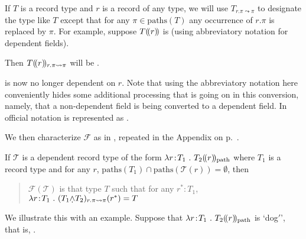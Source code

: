 \begin{shaded}
If $T$ is a
record type and $r$ is a record of any type, we will use
$T_{r.\pi\leadsto\pi}$ to designate the type like $T$ except that
for any $\pi\in\mathrm{paths}(T)$ any occurrence of $r.\pi$ is
replaced by $\pi$.  For example, suppose $T(\!(r)\!)$ is \nexteg{} (using
abbreviatory notation for dependent fields).
\begin{ex} 
\end{ex}
Then $T(\!(r)\!)_{r.\pi\leadsto\pi}$ will be \nexteg{}. 
\begin{ex} 
\end{ex} 
\preveg{} is now no longer dependent on $r$.  Note that using the abbreviatory notation here conveniently hides some
additional processing that is going on in this conversion, namely,
that a non-dependent field is being converted to a dependent field. In
official notation \preveg{} is represented as \nexteg{}. 
  \begin{ex} 
\end{ex} 
We then characterize $\mathcal{F}$ as in \nexteg{}, repeated in the
Appendix on p.~\pageref{pg:fixedpointtype}.
\begin{ex} 
If $\mathcal{T}$ is a dependent record type of the form $\lambda
r\!:\!T_1\ .\ T_2(\!(r)\!)_{\text{path}}$ where $T_1$ is a record type and for any
$r$,
$\mathrm{paths}(T_1)\cap\mathrm{paths}(\mathcal{T}(r))=\emptyset$,
then
\begin{quote}
  $\mathcal{F}(\mathcal{T})$ is that type $T$ such that for any
  $r^*:T_1$, $\lambda r\!:\!T_1\ .\
  (T_1\text{\d{$\wedge$}}T_2)_{r.\pi\leadsto\pi}(r^*)=T$
\end{quote}
\label{ex:fixedpointtype}
\end{ex}
We illustrate this with an example.  Suppose that $\lambda
r\!:\!T_1\ .\ T_2(\!(r)\!)_{\text{path}}$ is
`dog$'$', that is, \nexteg{}.
\begin{ex} 

\end{ex}
\end{shaded}
